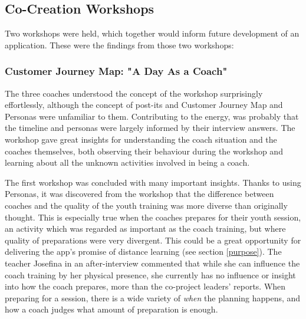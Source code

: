 \subsection{Co-Creation Workshops}


    Two workshops were held, which together would inform future development of an application. These were the findings from those two workshops:

    \subsubsection{Customer Journey Map: "A Day As a Coach"}




    The three coaches understood the concept of the workshop surprisingly effortlessly, although the concept of post-its and Customer Journey Map and Personas were unfamiliar to them. Contributing to the energy, was probably that the timeline and personas were largely informed by their interview answers. The workshop gave great insights for understanding the coach situation and the coaches themselves, both observing their behaviour during the workshop and learning about all the unknown activities involved in being a coach.

    The first workshop was concluded with many important insights. Thanks to using Personas, it was discovered from the workshop that the difference between coaches and the quality of the youth training was more diverse than originally thought. This is especially true when the coaches prepares for their youth session, an activity which was regarded as important as the coach training, but where quality of preparations were very divergent. This could be a great opportunity for delivering the app's promise of distance learning (see section \ref{purpose}). The teacher Josefina in an after-interview commented that while she can influence the coach training by her physical presence, she currently has no influence or insight into how the coach prepares, more than the co-project leaders' reports. When preparing for a session, there is a wide variety of \textit{when} the planning happens, and how a coach judges what amount of preparation is enough.


